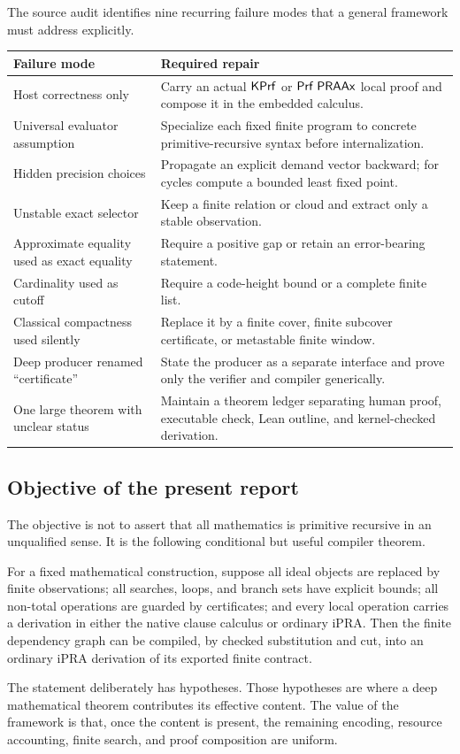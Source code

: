 The source audit identifies nine recurring failure modes that a general
framework must address explicitly.

\begin{longtable}{L{0.25\textwidth}L{0.66\textwidth}}
\toprule
Failure mode & Required repair \\
\midrule
Host correctness only & Carry an actual \(\mathsf{KPrf}\) or \(\mathsf{Prf}\;\mathsf{PRAAx}\) local proof and compose it in the embedded calculus.\\
Universal evaluator assumption & Specialize each fixed finite program to concrete primitive-recursive syntax before internalization.\\
Hidden precision choices & Propagate an explicit demand vector backward; for cycles compute a bounded least fixed point.\\
Unstable exact selector & Keep a finite relation or cloud and extract only a stable observation.\\
Approximate equality used as exact equality & Require a positive gap or retain an error-bearing statement.\\
Cardinality used as cutoff & Require a code-height bound or a complete finite list.\\
Classical compactness used silently & Replace it by a finite cover, finite subcover certificate, or metastable finite window.\\
Deep producer renamed ``certificate'' & State the producer as a separate interface and prove only the verifier and compiler generically.\\
One large theorem with unclear status & Maintain a theorem ledger separating human proof, executable check, Lean outline, and kernel-checked derivation.\\
\bottomrule
\end{longtable}

\subsection{Objective of the present report}

The objective is not to assert that all mathematics is primitive recursive in
an unqualified sense.  It is the following conditional but useful compiler
theorem.

\begin{principle}
For a fixed mathematical construction, suppose all ideal objects are replaced
by finite observations; all searches, loops, and branch sets have explicit
bounds; all non-total operations are guarded by certificates; and every local
operation carries a derivation in either the native clause calculus or ordinary
iPRA.  Then the finite dependency graph can be compiled, by checked
substitution and cut, into an ordinary iPRA derivation of its exported finite
contract.
\end{principle}

The statement deliberately has hypotheses.  Those hypotheses are where a deep
mathematical theorem contributes its effective content.  The value of the
framework is that, once the content is present, the remaining encoding,
resource accounting, finite search, and proof composition are uniform.
